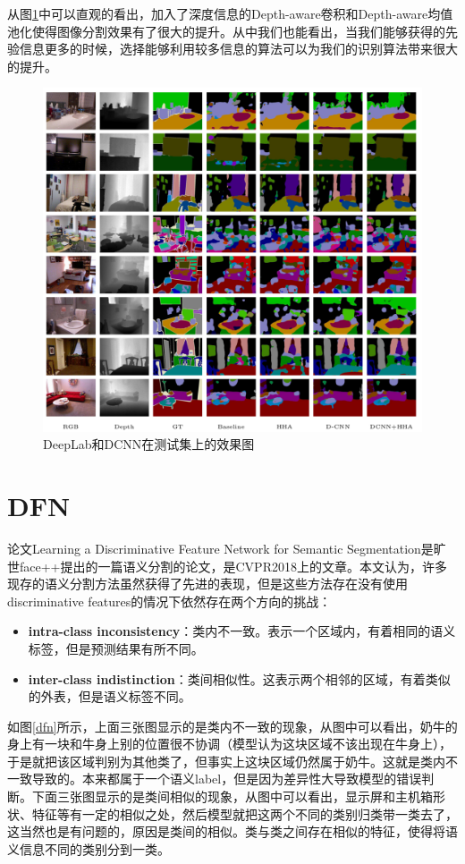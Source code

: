 \documentclass[cn]{elegantbook}
\begin{document}
从图\ref{res2}中可以直观的看出，加入了深度信息的Depth-aware卷积和Depth-aware均值池化使得图像分割效果有了很大的提升。从中我们也能看出，当我们能够获得的先验信息更多的时候，选择能够利用较多信息的算法可以为我们的识别算法带来很大的提升。
\begin{figure}[h]
	\centering
	\includegraphics[width=\textwidth]{images/res2.png}
	\caption{\label{res2}DeepLab和DCNN在测试集上的效果图}
\end{figure}

\section{DFN}
论文Learning a Discriminative Feature Network for Semantic Segmentation\cite{yu2018learning}是旷世face++提出的一篇语义分割的论文，是CVPR2018上的文章。本文认为，许多现存的语义分割方法虽然获得了先进的表现，但是这些方法存在没有使用discriminative features的情况下依然存在两个方向的挑战：
\begin{itemize}
	\item \textbf{intra-class inconsistency}：类内不一致。表示一个区域内，有着相同的语义标签，但是预测结果有所不同。
	\item \textbf{inter-class indistinction}：类间相似性。这表示两个相邻的区域，有着类似的外表，但是语义标签不同。
\end{itemize}

如图\ref{dfn}所示，上面三张图显示的是类内不一致的现象，从图中可以看出，奶牛的身上有一块和牛身上别的位置很不协调（模型认为这块区域不该出现在牛身上），于是就把该区域判别为其他类了，但事实上这块区域仍然属于奶牛。这就是类内不一致导致的。本来都属于一个语义label，但是因为差异性大导致模型的错误判断。下面三张图显示的是类间相似的现象，从图中可以看出，显示屏和主机箱形状、特征等有一定的相似之处，然后模型就把这两个不同的类别归类带一类去了，这当然也是有问题的，原因是类间的相似。类与类之间存在相似的特征，使得将语义信息不同的类别分到一类。
\end{document}
